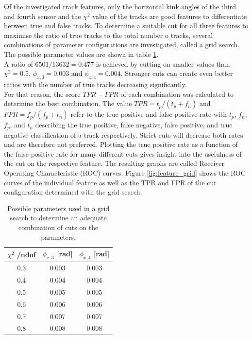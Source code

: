 Of the investigated track features, only the horizontal kink angles of the third and fourth sensor and the $\chi^2$ value of the tracks are good
features to differentiate between true and false tracks. To determine a suitable
cut for all three features to maximise the ratio of true tracks to the total number o tracks, several combinations of parameter configurations are investigated, called a
grid search.
The possible parameter values are shown in table \ref{tab:params}. \\
A ratio of $6501/13632 = 0.477$ is achieved by cutting on smaller values
than $\chi^2 = 0.5$, $\phi_{x,3} = 0.003$ and $\phi_{x,4}=0.004$.
Stronger cuts can create even better ratios with the number of true tracks decreasing significantly. \\
For that reason, the score $TPR-FPR$ of each combination
was calculated to determine the best combination. The value $TPR = t_p/(t_p + f_n)$ and $FPR = f_p/(f_p + t_n)$
refer to the true positive and false positive rate with
$t_p$, $f_n$, $f_p$, and $t_n$ describing the true positive, false negative, false positive, and true negative classification of a track respectively.
Strict cuts will decrease both rates and are therefore not preferred. Plotting the
true positive rate as a function of the false positive rate for many different cuts gives insight into the usefulness of the cut on the respective feature. The resulting
graphs are called Receiver Operating Characteristic (ROC) curves.
Figure \ref{fig:feature_grid} shows the ROC curves of the individual feature as well as the TPR and FPR of the cut configuration determined with the grid search.

\begin{table}
  \centering
  \begin{tabular}{c c c}
    \toprule
    $\chi^2$ /ndof & $\phi_{x,3}$ [rad] & $\phi_{x,4}$ [rad]\\
    \midrule
    0.3 & 0.003 & 0.003 \\
    0.4 & 0.004 & 0.004 \\
    0.5 & 0.005 & 0.005 \\
    0.6 & 0.006 & 0.006 \\
    0.7 & 0.007 & 0.007 \\
    0.8 & 0.008 & 0.008
  \end{tabular}
  \caption{Possible parameters used in a grid search to determine an adequate combination of cuts on the parameters.}
  \label{tab:params}
\end{table}




